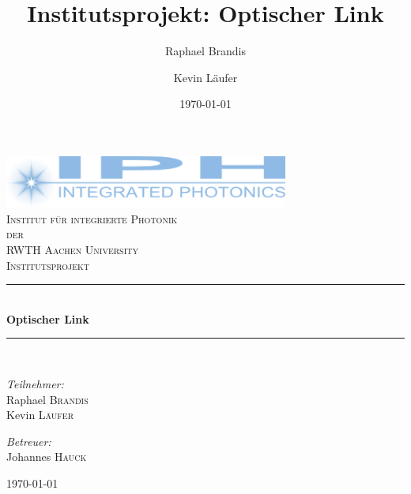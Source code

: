 \documentclass[12pt,a4paper]{article}
\title{Institutsprojekt: Optischer Link}
\author{Raphael Brandis \and Kevin Läufer}
\date{\today}
\begin{document}
\begin{titlepage}
\begin{center}

\includegraphics[width=0.7\textwidth]{../iph_logo.png}~\\[1cm]

\textsc{\LARGE Institut für integrierte Photonik}\\[0.5cm]

\textsc{\Large der}\\[0.5cm]

\textsc{\LARGE RWTH Aachen University}\\[1.5cm]


\textsc{\Large Institutsprojekt}\\[0.5cm]

\rule{\linewidth}{0.5mm} \\[0.4cm]
{ \huge \bfseries Optischer Link \\[0.4cm] }

\rule{\linewidth}{0.5mm} \\[1.5cm]

\begin{minipage}{0.4\textwidth}
\begin{flushleft} \large
\emph{Teilnehmer:}\\
Raphael \textsc{Brandis}\\
Kevin \textsc{Läufer}
\end{flushleft}
\end{minipage}
\begin{minipage}{0.4\textwidth}
\begin{flushright} \large
\emph{Betreuer:} \\
Johannes \textsc{Hauck}
\end{flushright}
\end{minipage}

\vfill

{\large \today}

\end{center}
\end{titlepage}


\end{document}
